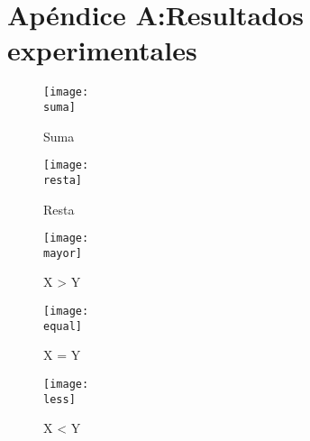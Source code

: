 \documentclass[a4paper, 12pt]{article}
\newcommand{\suma}{imag/fourierB.png}
\newcommand{\resta}{imag/graffA1.png}
\newcommand{\equal}{imag/graffA2.png}
\newcommand{\less}{imag/graffA3.png}
\newcommand{\mayor}{imag/graffA4.png}
\begin{document}
    \section*{Apéndice A:Resultados experimentales}
    \begin{figure}[H]
        \centering
        \texttt{[image: \\suma]}
        \caption{Suma}
    \end{figure}
    \begin{figure}[H]
        \centering
        \texttt{[image: \\resta]}
        \caption{Resta}
    \end{figure}
    \begin{figure}[H]
        \centering
        \texttt{[image: \\mayor]}
        \caption{X > Y}
    \end{figure}
    \begin{figure}[H]
        \centering
        \texttt{[image: \\equal]}
        \caption{X = Y}
    \end{figure}
    \begin{figure}[H]
        \centering
        \texttt{[image: \\less]}
        \caption{X < Y}
    \end{figure}
\end{document}
